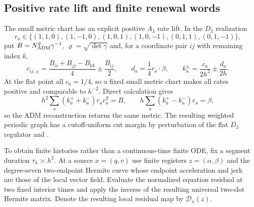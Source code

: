 \documentclass[11pt]{article}
\theoremstyle{definition}
\theoremstyle{remark}
\begin{document}
\subsection{Positive rate lift and finite renewal words}

The small metric chart has an explicit positive $A_3$ rate lift.  In the
$D_3$ realization
\begin{equation}
 r_a\in\{(1,1,0),(1,-1,0),(1,0,1),(1,0,-1),(0,1,1),(0,1,-1)\},
 \label{eq:supp-open-d3-roots}
\end{equation}
put $B=N_{\rm ADM}^2\gamma^{-1}$, $\varrho=\sqrt{\det\gamma}$ and, for a
coordinate pair $ij$ with remaining index $k$,
\begin{equation}
 c_{ij,\pm}=\frac{B_{ii}+B_{jj}-B_{kk}}4\pm\frac{B_{ij}}2,
 \qquad d_a=\frac14r_a\cdot\beta,\qquad
 k_a^\pm=\frac{c_a}{2h^2}\pm\frac{d_a}{2h}.
 \label{eq:supp-open-rate-lift}
\end{equation}
At the flat point all $c_a=1/4$, so a fixed small metric chart makes all
rates positive and comparable to $h^{-2}$.  Direct calculation gives
\begin{equation}
 h^2\sum_a(k_a^++k_a^-)r_ar_a^T=B,
 \qquad h\sum_a(k_a^+-k_a^-)r_a=\beta,
 \label{eq:supp-open-rate-inversion}
\end{equation}
so the ADM reconstruction returns the same metric.  The resulting weighted
periodic graph has a cutoff-uniform cut margin by perturbation of the flat
$D_3$ regulator and .

To obtain finite histories rather than a continuous-time finite ODE, fix a
segment duration $\tau_h\asymp h^2$.  At a source $x=(q,v)$ use finite
registers $z=(\alpha,\beta)$ and the degree-seven two-endpoint Hermite curve
whose endpoint acceleration and jerk are those of the local vector field.
Evaluate the normalized equation residual at two fixed interior times and
apply the inverse of the resulting universal two-slot Hermite matrix.  Denote
the resulting local residual map by $\mathscr D_x(z)$.
\end{document}
